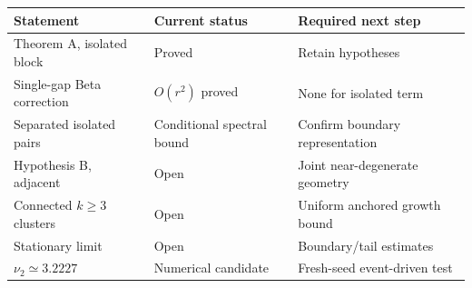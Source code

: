 \documentclass[11pt]{article}
\theoremstyle{remark}\newtheorem{remark}[theorem]{Remark}
\begin{document}
\begin{center}\footnotesize
\renewcommand{\arraystretch}{1.12}
\begin{tabularx}{\textwidth}{@{}p{}p{}X@{}}\toprule
Statement & Current status & Required next step\\\midrule
Theorem A, isolated block & Proved & Retain hypotheses\\
Single-gap Beta correction & $O(r^2)$ proved & None for isolated term\\
Separated isolated pairs & Conditional spectral bound & Confirm boundary representation\\
Hypothesis B, adjacent & Open & Joint near-degenerate geometry\\
Connected $k\ge3$ clusters & Open & Uniform anchored growth bound\\
Stationary limit & Open & Boundary/tail estimates\\
$\nu_2\simeq3.2227$ & Numerical candidate & Fresh-seed event-driven test\\\bottomrule
\end{tabularx}
\end{center}
\end{document}
